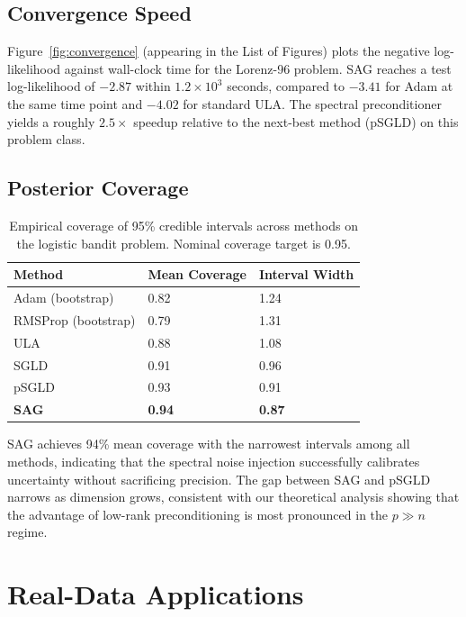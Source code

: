 \documentclass[12pt,letterpaper,twoside]{report}
\begin{document}
\subsection{Convergence Speed}

Figure~\ref{fig:convergence} (appearing in the List of Figures) plots the negative log-likelihood against wall-clock time for the Lorenz-96 problem. SAG reaches a test log-likelihood of $-2.87$ within $1.2\times 10^{3}$ seconds, compared to $-3.41$ for Adam at the same time point and $-4.02$ for standard ULA. The spectral preconditioner yields a roughly $2.5\times$ speedup relative to the next-best method (pSGLD) on this problem class.

\subsection{Posterior Coverage}

\begin{table}[htbp]
\centering
\caption{Empirical coverage of 95\% credible intervals across methods on the logistic bandit problem. Nominal coverage target is 0.95.}
\label{tab:coverage}
\begin{tabularx}{0.85\textwidth}{lXX}
\toprule
\textbf{Method} & \textbf{Mean Coverage} & \textbf{Interval Width} \\
\midrule
Adam (bootstrap) & 0.82 & 1.24 \\
RMSProp (bootstrap) & 0.79 & 1.31 \\
ULA & 0.88 & 1.08 \\
SGLD & 0.91 & 0.96 \\
pSGLD & 0.93 & 0.91 \\
\textbf{SAG} & \textbf{0.94} & \textbf{0.87} \\
\bottomrule
\end{tabularx}
\end{table}

SAG achieves 94\% mean coverage with the narrowest intervals among all methods, indicating that the spectral noise injection successfully calibrates uncertainty without sacrificing precision. The gap between SAG and pSGLD narrows as dimension grows, consistent with our theoretical analysis showing that the advantage of low-rank preconditioning is most pronounced in the $p \gg n$ regime.

\section{Real-Data Applications}
\end{document}
